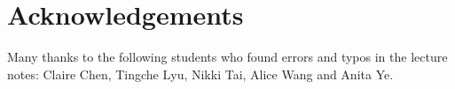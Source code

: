 \chapter*{Acknowledgements}%
\label{cha:acknowledgements}

Many thanks to the following students who found errors and typos in the lecture notes:
Claire Chen, Tingche Lyu, Nikki Tai, Alice Wang and Anita Ye.
